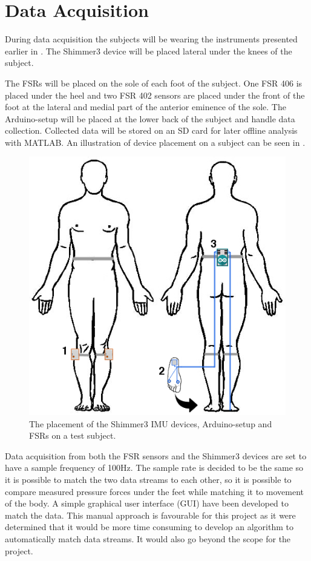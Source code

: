 \section{Data Acquisition}

During data acquisition the subjects will be wearing the instruments presented earlier in . The Shimmer3 device will be placed lateral under the knees of the subject.

The FSRs will be placed on the sole of each foot of the subject. One FSR 406 is placed under the heel and two FSR 402 sensors are placed under the front of the foot at the lateral and medial part of the anterior eminence of the sole. The Arduino-setup will be placed at the lower back of the subject and handle data collection. Collected data will be stored on an SD card for later offline analysis with MATLAB. An illustration of device placement on a subject can be seen in .


\begin{figure}[H]
	\includegraphics[width=.6\textwidth]{figures/bodySysSetup}
	\caption{The placement of the Shimmer3 IMU devices, Arduino-setup and FSRs on a test subject.}
	\label{fig:bodySysSetup}  %
\end{figure}

Data acquisition from both the FSR sensors and the Shimmer3 devices are set to have a sample frequency of 100Hz. The sample rate is decided to be the same so it is possible to match the two data streams to each other, so it is possible to compare measured pressure forces under the feet while matching it to movement of the body. A simple graphical user interface (GUI) have been developed to match the data. This manual approach is favourable for this project as it were determined that it would be more time consuming to develop an algorithm to automatically match data streams. It would also go beyond the scope for the project.






